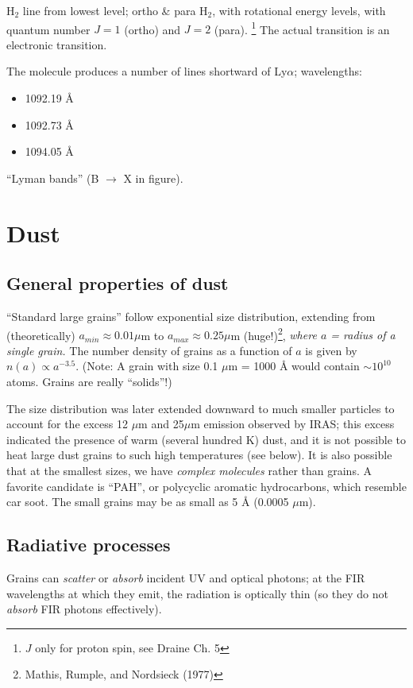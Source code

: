 \documentclass[11pt]{article}
\newcommand{\mar}[1]{\hspace{0pt}\marginpar{-\textcolor{black}{#1}-}}
\newcommand{\mynotes}[1]{{\fontfamily{cmss}\selectfont \textit{#1}}}
\begin{document}
H$_{2}$ line from lowest level; ortho \& para H$_{2}$, with rotational
energy levels, with quantum number $J=1$ (ortho) and $J=2$ (para).
\footnote{$J$ only for proton spin, see Draine Ch. 5}
The actual transition is an electronic transition.

The molecule produces a number of lines shortward of Ly$\alpha$;
wavelengths:
\begin{itemize}
    \item 1092.19 \AA{}
    \item 1092.73 \AA{}
    \item 1094.05 \AA{}
\end{itemize}
``Lyman bands'' (B $\rightarrow$ X in figure).

\newpage
\section{Dust}
\subsection{General properties of dust}
\mar{104}``Standard large grains'' follow exponential size distribution,
extending from (theoretically) $a_{min} \approx 0.01 \mu$m to $a_{max} \approx
0.25 \mu$m (huge!)\footnote{Mathis, Rumple, and Nordsieck (1977)},
\mynotes{where $a$ = radius of a single grain.} The number density of grains as
a function of $a$ is given by $n(a) \propto a^{-3.5}$. (Note: A grain with size
0.1 $\mu$m = 1000 \AA{} would contain $\sim 10^{10}$ atoms. Grains are really
``solids''!)

The size distribution was later extended downward to much smaller particles to
account for the excess 12 $\mu$m and 25$\mu$m emission observed by IRAS; this
excess indicated the presence of warm (several hundred K) dust, and it is not
possible to heat large dust grains to such high temperatures (see below). It is
also possible that at the smallest sizes, we have \textit{complex molecules}
rather than grains. A favorite candidate is ``PAH'', or polycyclic aromatic
hydrocarbons, which resemble car soot. The small grains may be as small as 5
\AA{} (0.0005 $\mu$m).

\subsection{Radiative processes}
Grains can \emph{scatter} or \emph{absorb} incident UV and optical photons; at
the FIR wavelengths at which they emit, the radiation is optically thin (so
they do not \mar{105}\emph{absorb} FIR photons effectively).
\end{document}
